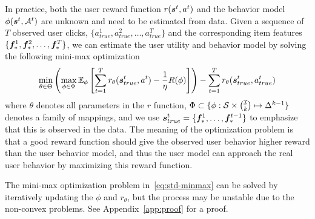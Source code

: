 \documentclass{article} %
\newcommand{\xc}[1]{{\color{blue}{\bf\sf [#1]}}}
\newcommand{\xinshi}[1]{{\color{black}{#1}}}
\begin{document}
In practice, both the user reward function $r({\bm{s}}^t,a^t)$ and the behavior model $\phi({\bm{s}}^t, {\mathcal{A}}^t)$ are unknown and need to be estimated from data. Given a sequence of $T$ observed user clicks, $\{a^1_{true},a^2_{true},\ldots,a^T_{true}\}$ and the corresponding item features $\{{\bm{f}}_\ast^1, {\bm{f}}_\ast^2, \ldots, {\bm{f}}_\ast^T\}$, we can estimate the user utility and behavior model by solving the following mini-max optimization 
{\small \begin{equation}\label{eq:std-minmax}
	\min_{\theta \in \Theta} \left(\max_{\phi\in \Phi}  \mathbb{E}_{\phi} \left[\sum_{t=1}^Tr_{\theta}({\bm{s}}^t_{true}, a^t) -\frac{1}{\eta}R(\phi)\right]\right)-\sum_{t=1}^T r_{\theta}({\bm{s}}^t_{true}, a^t_{true})
\end{equation}}
where $\theta$ denotes all parameters in the $r$ function, $\Phi \subset \{\phi:{\mathcal{S}} \times {{\mathcal{I}}\choose k} \mapsto \Delta^{k-1}\}$ denotes a family of mappings, and we use ${\bm{s}}^t_{true}=\{{\bm{f}}_\ast^1,\ldots,{\bm{f}}_\ast^{t-1}\}$ to emphasize that this is observed in the data. 
The meaning of the optimization problem is that 
a good reward function should give the observed user behavior higher reward than the user behavior model, and thus the user model can approach the real user behavior by maximizing this reward function. 

The mini-max optimization problem in~\eqref{eq:std-minmax} can be  solved by iteratively updating the $\phi$ and $r_{\theta}$, but the process may be unstable due to the non-convex problems.  
\xinshi{We will explain how we can make use of a special closed form to help initialize the mini-max optimization after the statement of the following lemma.} See Appendix~\ref{app:proof} for a proof.   

\end{document}

